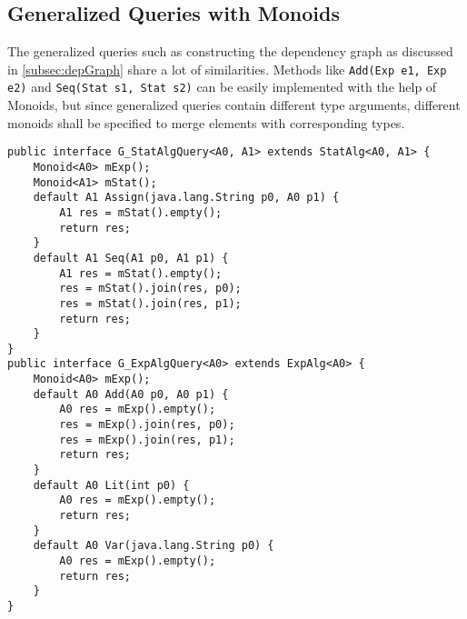 \subsection{Generalized Queries with Monoids}\label{subsec:generalizedQuery}
The generalized queries such as constructing the dependency graph as discussed in \ref{subsec:depGraph} share a lot of similarities. Methods like \lstinline{Add(Exp e1, Exp e2)} and \lstinline{Seq(Stat s1, Stat s2)} can be easily implemented with the help of Monoids, but since generalized queries contain different type arguments, different monoids shall be specified to merge elements with corresponding types. 

\begin{comment}
\begin{lstlisting}[numbers=none]
public interface G_StatAlgQuery<A0, A1> extends StatAlg<A0, A1>, ExpAlg<A0> { 
	Monoid<A0> mExp();
	Monoid<A1> mStat();
	default A0 Add(A0 p0, A0 p1) {
		A0 res = mExp().empty();
		res = mExp().join(res, p0);
		res = mExp().join(res, p1);
		return res;
	}
	default A0 Lit(int p0) {
		A0 res = mExp().empty();
		return res;
	}
	default A0 Var(java.lang.String p0) {
		A0 res = mExp().empty();
		return res;
	}
	default A1 Assign(java.lang.String p0, A0 p1) {
		A1 res = mStat().empty();
		return res;
	}
	default A1 Seq(A1 p0, A1 p1) {
		A1 res = mStat().empty();
		res = mStat().join(res, p0);
		res = mStat().join(res, p1);
		return res;
	}
}
\end{lstlisting}
\end{comment}


\begin{lstlisting}[numbers=none]
public interface G_StatAlgQuery<A0, A1> extends StatAlg<A0, A1> {
	Monoid<A0> mExp();
	Monoid<A1> mStat();
	default A1 Assign(java.lang.String p0, A0 p1) {
		A1 res = mStat().empty();
		return res;
	}
	default A1 Seq(A1 p0, A1 p1) {
		A1 res = mStat().empty();
		res = mStat().join(res, p0);
		res = mStat().join(res, p1);
		return res;
	}
}
public interface G_ExpAlgQuery<A0> extends ExpAlg<A0> {
	Monoid<A0> mExp();
	default A0 Add(A0 p0, A0 p1) {
		A0 res = mExp().empty();
		res = mExp().join(res, p0);
		res = mExp().join(res, p1);
		return res;
	}
	default A0 Lit(int p0) {
		A0 res = mExp().empty();
		return res;
	}
	default A0 Var(java.lang.String p0) {
		A0 res = mExp().empty();
		return res;
	}
}
\end{lstlisting}

